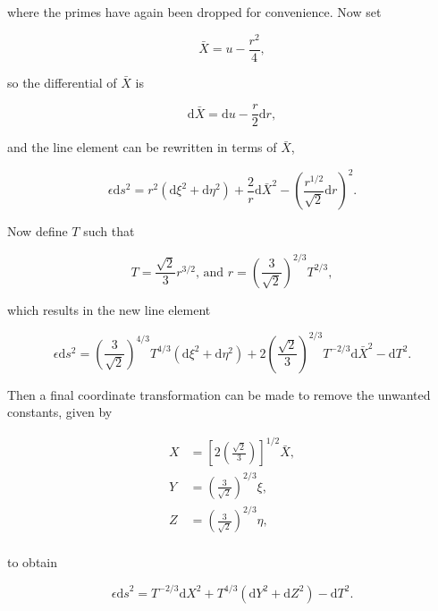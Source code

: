 \noindent where the primes have again been dropped for convenience. Now set

\begin{equation*}
\bar{X} = u - \frac{r^2}{4},
\end{equation*}

\noindent so the differential of $\bar{X}$ is

\begin{equation*}
\mathrm{d} \bar{X} = \mathrm{d} u - \frac{r}{2} \mathrm{d}r,
\end{equation*}

\noindent and the line element can be rewritten in terms of $\bar{X}$,

\begin{equation*}
\epsilon \mathrm{d} s^2 = r^2 (\mathrm{d} \xi^2 + \mathrm{d} \eta^2) + \frac{2}{r} \mathrm{d} \bar{X}^2 - {\left( \frac{r^{1/2}}{\sqrt{2}} \mathrm{d} r\right)}^{2}.
\end{equation*}

\noindent Now define $T$ such that

\begin{equation*}
T = \frac{\sqrt{2}}{3} r^{3/2} \text{,       and    } r = {\left( \frac{3}{\sqrt{2}} \right)}^{2/3} T^{2/3},
\end{equation*}

\noindent which results in the new line element

\begin{equation*}
\epsilon \mathrm{d} s^2 = \left( \frac{3}{\sqrt{2}} \right)^{4/3} T^{4/3} (\mathrm{d} \xi^2 + \mathrm{d} \eta^2) + 2 \left( \frac{\sqrt{2}}{3}\right)^{2/3} T^{-2/3} \mathrm{d} \bar{X}^2 - \mathrm{d} T^2.
\end{equation*}

\noindent Then a final coordinate transformation can be made to remove the unwanted constants, given by

\begin{align*} 
X & = \left[ 2\left( \frac{\sqrt{2}}{3}\right)\right]^{1/2} \bar{X}, \\
Y & = \left( \frac{3}{\sqrt{2}} \right)^{2/3} \xi, \\
Z & = \left( \frac{3}{\sqrt{2}} \right)^{2/3} \eta, \\
\end{align*} 

\noindent to obtain

\begin{equation}\label{Our_Kasner} 
\epsilon {\mathrm{d}s}^2 = T^{-2/3} {\mathrm{d}X}^2 + T^{4/3} \left( \mathrm{d}Y^2 + \mathrm{d}Z^2 \right) - \mathrm{d}T^2.
\end{equation}

